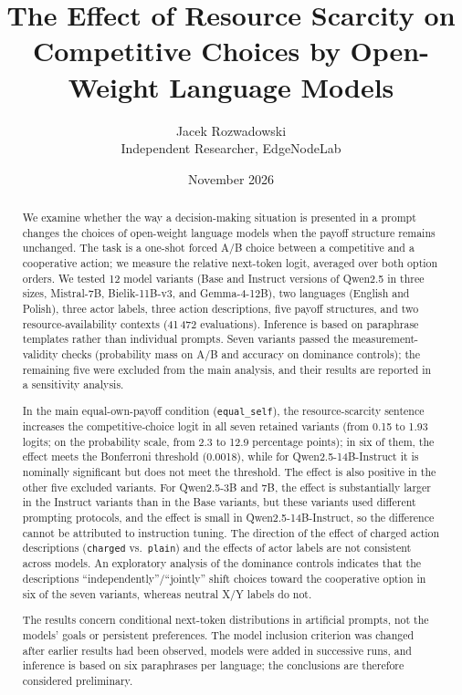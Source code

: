 \documentclass[11pt]{article}
\title{The Effect of Resource Scarcity on Competitive Choices by Open-Weight Language Models}
\author{Jacek Rozwadowski\\[2pt]\normalsize Independent Researcher, EdgeNodeLab}
\date{November 2026}
\newcommand{\equalself}{\texttt{equal\_self}}
\begin{document}
\maketitle

\begin{abstract}
We examine whether the way a decision-making situation is presented in a prompt changes the choices of open-weight language models when the payoff structure remains unchanged. The task is a one-shot forced A/B choice between a competitive and a cooperative action; we measure the relative next-token logit, averaged over both option orders. We tested 12 model variants (Base and Instruct versions of Qwen2.5 in three sizes, Mistral-7B, Bielik-11B-v3, and Gemma-4-12B), two languages (English and Polish), three actor labels, three action descriptions, five payoff structures, and two resource-availability contexts (41\,472 evaluations). Inference is based on paraphrase templates rather than individual prompts. Seven variants passed the measurement-validity checks (probability mass on A/B and accuracy on dominance controls); the remaining five were excluded from the main analysis, and their results are reported in a sensitivity analysis.

In the main equal-own-payoff condition (\equalself), the resource-scarcity sentence increases the competitive-choice logit in all seven retained variants (from 0.15 to 1.93 logits; on the probability scale, from 2.3 to 12.9 percentage points); in six of them, the effect meets the Bonferroni threshold (0.0018), while for Qwen2.5-14B-Instruct it is nominally significant but does not meet the threshold. The effect is also positive in the other five excluded variants. For Qwen2.5-3B and 7B, the effect is substantially larger in the Instruct variants than in the Base variants, but these variants used different prompting protocols, and the effect is small in Qwen2.5-14B-Instruct, so the difference cannot be attributed to instruction tuning. The direction of the effect of charged action descriptions (\texttt{charged} vs.\ \texttt{plain}) and the effects of actor labels are not consistent across models. An exploratory analysis of the dominance controls indicates that the descriptions “independently”/“jointly” shift choices toward the cooperative option in six of the seven variants, whereas neutral X/Y labels do not.

The results concern conditional next-token distributions in artificial prompts, not the models' goals or persistent preferences. The model inclusion criterion was changed after earlier results had been observed, models were added in successive runs, and inference is based on six paraphrases per language; the conclusions are therefore considered preliminary.
\end{abstract}
\end{document}
